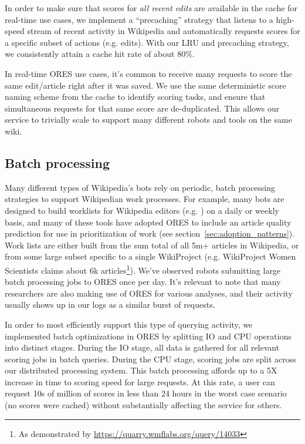In order to make sure that scores for \emph{all recent edits} are available in the cache for real-time use cases, we implement a ``precaching'' strategy that listens to a high-speed stream of recent activity in Wikipedia and automatically requests scores for a specific subset of actions (e.g. edits).  With our LRU and precaching strategy, we consistently attain a cache hit rate of about 80\%.

In real-time ORES use cases, it's common to receive many requests to score the same edit/article right after it was saved.  We use the same deterministic score naming scheme from the cache to identify scoring tasks, and ensure that simultaneous requests for that same score are de-duplicated.  This allows our service to trivially scale to support many different robots and tools on the same wiki.

\subsection{Batch processing}
Many different types of Wikipedia's bots rely on periodic, batch processing strategies to support Wikipedian work processes\cite{geiger2011lives}.  For example, many bots are designed to build worklists for Wikipedia editors (e.g. \cite{cosley2007suggestbot}) on a daily or weekly basis, and many of these tools have adopted ORES to include an article quality prediction for use in prioritization of work (see section~\ref{sec:adoption_patterns}).  Work lists are either built from the sum total of all 5m+ articles in Wikipedia, or from some large subset specific to a single WikiProject (e.g. WikiProject Women Scientists claims about 6k articles\footnote{As demonstrated by \url{https://quarry.wmflabs.org/query/14033}}).  We've observed robots submitting large batch processing jobs to ORES once per day.  It's relevant to note that many researchers are also making use of ORES for various analyses, and their activity usually shows up in our logs as a similar burst of requests.

In order to most efficiently support this type of querying activity, we implemented batch optimizations in ORES by splitting IO and CPU operations into distinct stages.  During the IO stage, all data is gathered for all relevant scoring jobs in batch queries.  During the CPU stage, scoring jobs are split across our distributed processing system.  This batch processing affords up to a 5X increase in time to scoring speed for large requests\cite{sarabadani2017building}.  At this rate, a user can request 10s of million of scores in less than 24 hours in the worst case scenario (no scores were cached) without substantially affecting the service for others.

